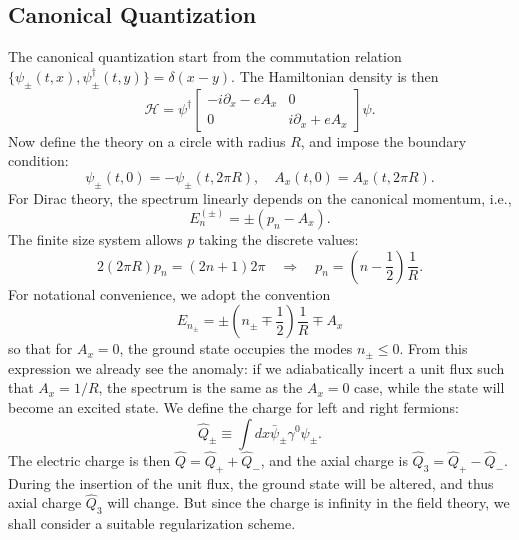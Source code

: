 \documentclass[aps,prb,superscriptaddress,nofootinbib]{revtex4}
\begin{document}
\subsection{Canonical Quantization}
The canonical quantization start from the commutation relation $\{\psi_\pm(t,x),\psi^\dagger_\pm(t,y)\} = \delta(x-y)$.
The Hamiltonian density is then
\begin{equation}
	\mathcal H = \psi^\dagger \begin{bmatrix}
		-i\partial_x - eA_x & 0 \\
		0 & i\partial_x + eA_x
	\end{bmatrix} \psi.
\end{equation}
Now define the theory on a circle with radius $R$, and impose the boundary condition:
\begin{equation}
	\psi_\pm(t,0) = -\psi_\pm(t,2\pi R),\quad
	A_x(t,0) = A_x(t,2\pi R).
\end{equation}
For Dirac theory, the spectrum linearly depends on the canonical momentum, i.e., 
\begin{equation}
	E_n^{(\pm)} = \pm(p_n-A_x).
\end{equation}
The finite size system allows $p$ taking the discrete values: 
\begin{equation}
	2(2\pi R) p_n = (2n+1)2\pi \quad \Longrightarrow \quad
	p_n = \left(n-\frac{1}{2}\right)\frac{1}{R}.
\end{equation}
For notational convenience, we adopt the convention 
\begin{equation}
	E_{n_\pm} = \pm \left(n_\pm \mp \frac{1}{2} \right) \frac{1}{R} \mp A_x
\end{equation}
so that for $A_x=0$, the ground state occupies the modes $n_\pm \le 0$.
From this expression we already see the anomaly: if we adiabatically incert a unit flux such that $A_x = 1/R$, the spectrum is the same as the $A_x=0$ case, while the state will become an excited state.
We define the charge for left and right fermions:
\begin{equation}
	\hat Q_\pm \equiv \int dx \bar\psi_\pm \gamma^0 \psi_\pm.
\end{equation}
The electric charge is then $\hat Q = \hat Q_+ + \hat Q_-$, and the axial charge is $\hat Q_3 = \hat Q_+ - \hat Q_-$.
During the insertion of the unit flux, the ground state will be altered, and thus axial charge $\hat Q_3$ will change.
But since the charge is infinity in the field theory, we shall consider a suitable regularization scheme.
\end{document}
